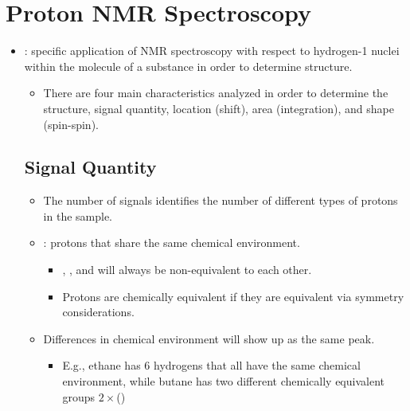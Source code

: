 \section{Proton NMR Spectroscopy}\label{Proton NMR Spectroscopy}
\begin{itemize}
    \item {}: specific application of NMR spectroscopy with respect to hydrogen-1 nuclei within the molecule of a substance in order to determine structure.
      \begin{itemize}
        \item There are four main characteristics analyzed in order to determine the structure, signal quantity, location (shift), area (integration), and shape (spin-spin).
      \end{itemize}
    
    \subsection{Signal Quantity}\label{Signal Quantity}
    \begin{itemize}
        \item The number of signals identifies the number of different types of protons in the sample.
        \item {}: protons that share the same chemical environment.
          \begin{itemize}
            \item {}, , and  will always be non-equivalent to each other.
            \item Protons are chemically equivalent if they are equivalent via symmetry considerations.
          \end{itemize}
        \item Differences in chemical environment will show up as the same peak.
          \begin{itemize}
            \item E.g., ethane has 6 hydrogens that all have the same chemical environment, while butane has two different chemically equivalent groups \(2\times \)()
          \end{itemize}
    \end{itemize}


\end{itemize}
